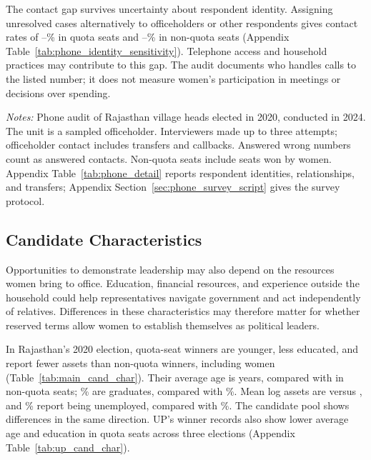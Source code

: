\documentclass[11pt]{article}
\begin{document}
The contact gap survives uncertainty about respondent identity. Assigning unresolved cases alternatively to officeholders or other respondents gives contact rates of \phoneQuotaLower{}--\phoneQuotaUpper{}\% in quota seats and \phoneOpenLower{}--\phoneOpenUpper{}\% in non-quota seats (Appendix Table~\ref{tab:phone_identity_sensitivity}). Telephone access and household practices may contribute to this gap. The audit documents who handles calls to the listed number; it does not measure women's participation in meetings or decisions over spending.

\begin{table}[!htbp]
    \centering
    \caption{Reaching Elected Representatives by Phone}
    \label{tab:full_survey}
    \small
    
    \medskip

    \begin{minipage}{0.95\textwidth}\footnotesize
    \emph{Notes:} Phone audit of Rajasthan village heads elected in 2020, conducted in 2024. The unit is a sampled officeholder. Interviewers made up to three attempts; officeholder contact includes transfers and callbacks. Answered wrong numbers count as answered contacts. Non-quota seats include seats won by women. Appendix Table~\ref{tab:phone_detail} reports respondent identities, relationships, and transfers; Appendix Section~\ref{sec:phone_survey_script} gives the survey protocol.
    \end{minipage}
\end{table}

\subsection{Candidate Characteristics}\label{sec:cand_char}

Opportunities to demonstrate leadership may also depend on the resources women bring to office. Education, financial resources, and experience outside the household could help representatives navigate government and act independently of relatives. Differences in these characteristics may therefore matter for whether reserved terms allow women to establish themselves as political leaders.

In Rajasthan's 2020 election, quota-seat winners are younger, less educated, and report fewer assets than non-quota winners, including women (Table~\ref{tab:main_cand_char}). Their average age is \allAgeQuota{} years, compared with \allAgeOpen{} in non-quota seats; \allGraduateQuota{}\% are graduates, compared with \allGraduateOpen{}\%. Mean log assets are \allLogassetsQuota{} versus \allLogassetsOpen{}, and \allUnemployedQuota{}\% report being unemployed, compared with \allUnemployedOpen{}\%. The candidate pool shows differences in the same direction. UP's winner records also show lower average age and education in quota seats across three elections (Appendix Table~\ref{tab:up_cand_char}).
\end{document}
